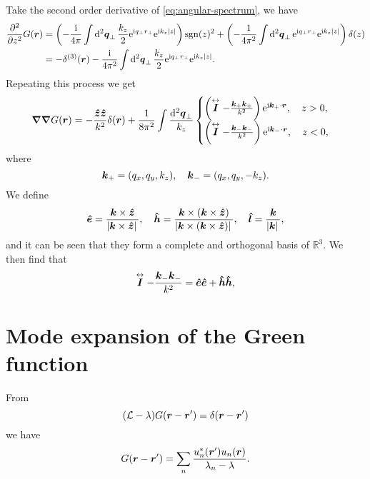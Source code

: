 \documentclass[hyperref, a4paper]{article}
\DeclareMathOperator{\sgn}{sgn}
\newcommand*{\ii}{\mathrm{i}}
\newcommand*{\ee}{\mathrm{e}}
\renewcommand{\tensor}[1]{ \stackrel{\leftrightarrow}{\vb*{#1}}}
\begin{document}
Take the second order derivative of \eqref{eq:angular-spectrum}, we have 
\[
    \begin{aligned}
        \pdv[2]{z} G(\vb*{r}) &= 
        \left( - \frac{\ii}{4\pi} \int \dd[2]{\vb*{q}_\bot} \frac{k_z}{2} \ee^{\ii q_\bot r_\bot} \ee^{\ii k_z \abs*{z}} \right) \sgn(z)^2
        + \left( - \frac{1}{4 \pi^2} \int \dd[2]{\vb*{q}_\bot} \ee^{\ii q_\bot r_\bot} \ee^{\ii k_z \abs*{z}} \right) \delta(z) \\
        &= - \delta^{(3)}(\vb*{r}) - \frac{\ii}{4\pi^2} \int \dd[2]{\vb*{q}_\bot} \frac{k_z}{2} \ee^{\ii q_\bot r_\bot} \ee^{\ii k_z \abs*{z}}.
    \end{aligned}
\]
Repeating this process we get 
\begin{equation}
    \grad \grad G(\vb*{r}) = - \frac{\vu*{z} \vu*{z}}{k^2} \delta(\vb*{r}) + \frac{1}{8 \pi^2} \int \frac{\dd[2]{\vb*{q}_\bot}}{k_z} 
    \begin{cases}
        \left( \tensor{\vb*{I}} - \frac{\vb*{k}_+ \vb*{k}_+}{k^2} \right) \ee^{\ii \vb*{k}_+ \cdot \vb*{r}}, \quad z > 0, \\
        \left( \tensor{\vb*{I}} - \frac{\vb*{k}_- \vb*{k}_-}{k^2} \right) \ee^{\ii \vb*{k}_- \cdot \vb*{r}}, \quad z < 0,
    \end{cases}
\end{equation}
where 
\begin{equation}
    \vb*{k}_+ = (q_x, q_y, k_z), \quad \vb*{k}_- = (q_x, q_y, - k_z).
\end{equation}
We define 
\begin{equation}
    \vu*{e} = \frac{\vb*{k} \times \vu*{z}}{\abs*{\vb*{k} \times \vu*{z}}}, 
    \quad \vu*{h} = \frac{\vb*{k} \times (\vb*{k} \times \vu*{z})}{\abs*{\vb*{k} \times (\vb*{k} \times \vu*{z})}},
    \quad \vu*{l} = \frac{\vb*{k}}{\abs*{\vb*{k}}},
\end{equation}
and it can be seen that they form a complete and orthogonal basis of $\mathbb{R}^3$. 
We then find that 
\begin{equation}
    \tensor{\vb*{I}} - \frac{\vb*{k}_- \vb*{k}_-}{k^2} = \vu*{e} \vu*{e} + \vu*{h} \vu*{h},
\end{equation}

\section{Mode expansion of the Green function}

From 
\[
    (\mathcal{L} - \lambda) G(\vb*{r} - \vb*{r}') = \delta(\vb*{r} - \vb*{r}')
\]
we have 
\begin{equation}
    G(\vb*{r} - \vb*{r}') = \sum_n \frac{u^*_n(\vb*{r}') u_n(\vb*{r})}{\lambda_n - \lambda}.
\end{equation}
\end{document}
